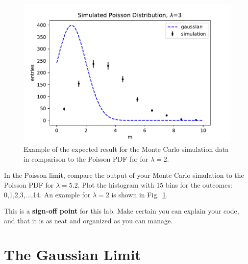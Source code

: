 \begin{figure}[htbp]
\begin{center}
\includegraphics[height=0.22\textheight]{figs/labs/distributions/poisson.pdf}
\end{center}
\caption{\label{fig:poisson} Example of the expected result for the Monte Carlo simulation data in comparison to the Poisson PDF for for $\lambda=2$. }
\end{figure}

\begin{plot} In the Poisson limit, compare the output of your Monte Carlo simulation to the Poisson PDF
for $\lambda=5.2$.
Plot the histogram with 15 bins for the outcomes: 0,1,2,3,...,14.  
An example for $\lambda=2$ is shown in Fig.~\ref{fig:poisson}.
\end{plot}


This is a \textbf{sign-off point} for this lab.  Make certain you can
explain your code, and that it is as neat and organized as you can
manage.

\section{The Gaussian Limit}

